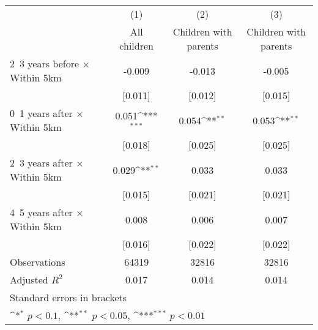 {
\def\sym#1{\ifmmode^{#1}\else\(^{#1}\)\fi}
\begin{tabular}{l*{3}{c}}
\hline\hline
                    &\multicolumn{1}{c}{(1)}&\multicolumn{1}{c}{(2)}&\multicolumn{1}{c}{(3)}\\
                    &\multicolumn{1}{c}{All children}&\multicolumn{1}{c}{Children with parents}&\multicolumn{1}{c}{Children with parents}\\
\hline
2~3 years before × Within 5km&      -0.009         &      -0.013         &      -0.005         \\
                    &     [0.011]         &     [0.012]         &     [0.015]         \\
0~1 years after × Within 5km&       0.051\sym{***}&       0.054\sym{**} &       0.053\sym{**} \\
                    &     [0.018]         &     [0.025]         &     [0.025]         \\
2~3 years after × Within 5km&       0.029\sym{**} &       0.033         &       0.033         \\
                    &     [0.015]         &     [0.021]         &     [0.021]         \\
4~5 years after × Within 5km&       0.008         &       0.006         &       0.007         \\
                    &     [0.016]         &     [0.022]         &     [0.022]         \\
\hline
Observations        &       64319         &       32816         &       32816         \\
Adjusted \(R^{2}\)  &       0.017         &       0.014         &       0.014         \\
\hline\hline
\multicolumn{4}{l}{\footnotesize Standard errors in brackets}\\
\multicolumn{4}{l}{\footnotesize \sym{*} \(p<0.1\), \sym{**} \(p<0.05\), \sym{***} \(p<0.01\)}\\
\end{tabular}
}
